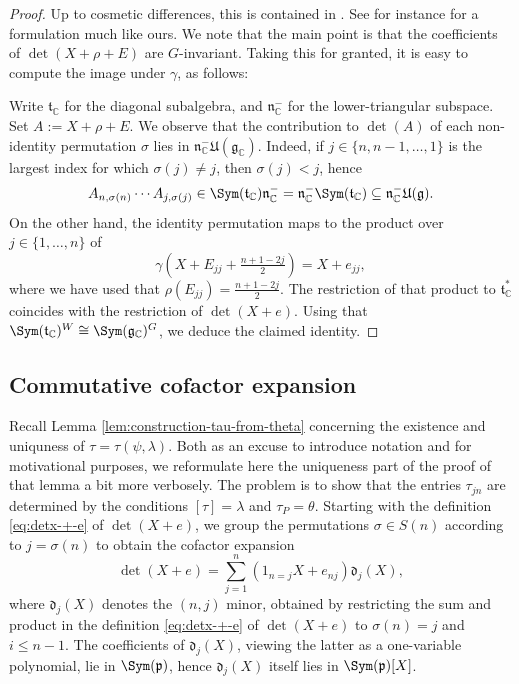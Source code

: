 \begin{proof}
  Up to cosmetic differences, this is contained in \cite{MR1116239}.  See for instance \cite[\S4.1]{MR2035111} for a formulation much like ours.  We note that the main point is that the coefficients of $\det(X + \rho + E)$ are $G$-invariant.  Taking this for granted, it is easy to compute the image under $\gamma$, as follows:

  Write $\mathfrak{t}_\mathbb{C}$ for the diagonal subalgebra, and $\mathfrak{n}_{\mathbb{C}}^{-}$ for the lower-triangular subspace.  Set $A := X + \rho + E$.  We observe that the contribution to $\det(A)$ of each non-identity permutation $\sigma$ lies in $\mathfrak{n}_\mathbb{C}^- \mathfrak{U}(\mathfrak{g}_\mathbb{C})$.  Indeed, if $j \in \{n, n - 1, \dotsc, 1\}$ is the largest index for which $\sigma(j) \neq j$, then $\sigma(j) < j$, hence
  \begin{equation*}
    A_{n, \sigma(n)} \dotsb A_{j, \sigma(j)}
    \in \Sym (\mathfrak{t}_{\mathbb{C}}) \mathfrak{n}_{\mathbb{C}}^-  = \mathfrak{n}_{\mathbb{C}}^- \Sym (\mathfrak{t}_{\mathbb{C}}) \subseteq \mathfrak{n}_{\mathbb{C}}^- \mathfrak{U}(\mathfrak{g}).
  \end{equation*}
  On the other hand, the identity permutation maps to the product over $j \in \{1, \dotsc, n\}$ of
  \[
    \gamma (X + E_{j j} + \tfrac{n +1 - 2 j}{2}) = X + e_{j j},
  \]
  where we have used that $\rho(E_{j j}) = \frac{n + 1 - 2 j}{2}$.  The restriction of that product to $\mathfrak{t}_\mathbb{C}^*$ coincides with the restriction of $\det(X+e)$.  Using that $\Sym(\mathfrak{t}_\mathbb{C})^W \cong \Sym(\mathfrak{g}_{\mathbb{C}})^G$, we deduce the claimed identity.
\end{proof}

\subsection{Commutative cofactor expansion}\label{sec:comm-cofact-expans}
Recall Lemma \ref{lem:construction-tau-from-theta} concerning the existence and uniquness of $\tau = \tau(\psi,\lambda)$.  Both as an excuse to introduce notation and for motivational purposes, we reformulate here the uniqueness part of the proof of that lemma a bit more verbosely.  The problem is to show that the entries $\tau_{j n}$ are determined by the conditions $[\tau] = \lambda$ and $\tau_P = \theta$.  Starting with the definition \eqref{eq:detx-+-e} of $\det(X + e)$, we group the permutations $\sigma \in S(n)$ according to $j = \sigma(n)$ to obtain the cofactor expansion
\begin{equation}\label{eq:detx-+-e-1}
  \det(X + e) = \sum_{j = 1}^n ( 1_{n=j} X + e_{n j} ) \mathfrak{d}_j(X),
\end{equation}
where $\mathfrak{d}_j(X)$ denotes the $(n,j)$ minor, obtained by restricting the sum and product in the definition \eqref{eq:detx-+-e} of $\det(X+e)$ to $\sigma(n) = j$ and $i \leq n-1$.  The coefficients of $\mathfrak{d}_j(X)$, viewing the latter as a one-variable polynomial, lie in $\Sym(\mathfrak{p})$, hence $\mathfrak{d}_j(X)$ itself lies in $\Sym(\mathfrak{p})[X]$.


